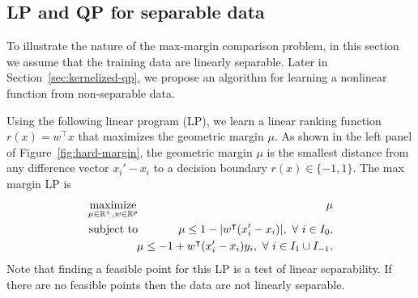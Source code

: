 \documentclass{article}
\newcommand{\RR}{\mathbb R}
\DeclareMathOperator*{\maximize}{maximize}
\begin{document}
\subsection{LP and QP for separable data}
\label{sec:lp-qp}

To illustrate the nature of the max-margin comparison problem, in this
section we assume that the training data are linearly separable. Later
in Section~\ref{sec:kernelized-qp}, we propose an algorithm for
learning a nonlinear function from non-separable data.

Using the following linear program (LP), we learn a linear ranking
function $r(x)=w^\intercal x$ that maximizes the geometric margin
$\mu$. As shown in the left panel of Figure~\ref{fig:hard-margin}, the
geometric margin $\mu$ is the smallest distance from any difference
vector $x_i'-x_i$ to a decision boundary $r(x)\in\{-1,1\}$. 
The
 max margin LP is
\begin{eqnarray}
  \label{eq:max-margin-lp}
  \maximize_{\mu\in\RR^+, w\in\RR^p}\ &&\hskip -0.5cm \mu \\
\nonumber
    \text{subject to}\ && \hskip -0.5cm \mu \leq 1-|w^\intercal (x_i' - x_i)|,\ 
    \forall\  i\in I_0,\\
\nonumber
    &&\hskip -0.5cm
\mu \leq -1 +  w^\intercal(x_i'-x_i)y_i,\ \forall\ i\in I_1\cup I_{-1}.
\end{eqnarray}
Note that finding a feasible point for this LP is a test of linear
separability. If there are no feasible points then the data are not
linearly separable. 
\end{document}
